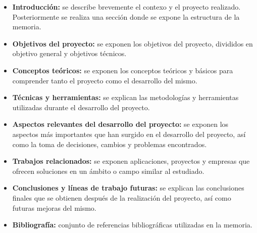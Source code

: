 \begin{itemize}
\item 
\textbf{Introducción:} se describe brevemente el contexo y el proyecto realizado. Posteriormente se realiza una sección donde se expone la estructura de la memoria.
\item 
\textbf{Objetivos del proyecto:} se exponen los objetivos del proyecto, divididos en objetivo general y objetivos técnicos.
\item
\textbf{Conceptos teóricos:} se exponen los conceptos teóricos y básicos para comprender tanto el proyecto como el desarrollo del mismo.
\item
\textbf{Técnicas y herramientas:} se explican las metodologías y herramientas utilizadas durante el desarrollo del proyecto.
\item
\textbf{Aspectos relevantes del desarrollo del proyecto:} se exponen los aspectos más importantes que han surgido en el desarrollo del proyecto, así como la toma de decisiones, cambios y problemas encontrados.
\item
\textbf{Trabajos relacionados:} se exponen aplicaciones, proyectos y empresas que ofrecen soluciones en un ámbito o campo similar al estudiado.
\item
\textbf{Conclusiones y líneas de trabajo futuras:} se explican las conclusiones finales que se obtienen después de la realización del proyecto, así como futuras mejoras del mismo.
\item
\textbf{Bibliografía:} conjunto de referencias bibliográficas utilizadas en la memoria. 
\end{itemize}